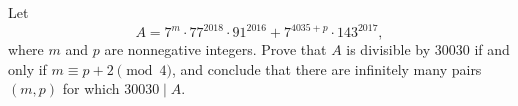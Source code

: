 Let
\[
A=7^m\cdot77^{2018}\cdot91^{2016}+7^{4035+p}\cdot143^{2017},
\]
where $m$ and $p$ are nonnegative integers. Prove that $A$ is divisible by $30030$ if and only if $m\equiv p+2\pmod4$, and conclude that there are infinitely many pairs $(m,p)$ for which $30030\mid A$.
